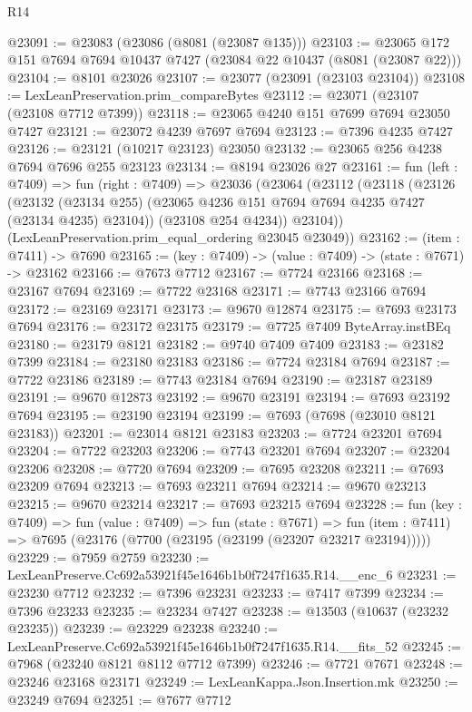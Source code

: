 \begin{lexlean}{R14}
\begin{coremodule}
@23091 := @23083 (@23086 (@8081 (@23087 @135)))
@23103 := @23065 @172 @151 @7694 @7694 @10437 @7427 (@23084 @22 @10437 (@8081 (@23087 @22)))
@23104 := @8101 @23026
@23107 := @23077 (@23091 (@23103 @23104))
@23108 := LexLeanPreservation.prim_compareBytes
@23112 := @23071 (@23107 (@23108 @7712 @7399))
@23118 := @23065 @4240 @151 @7699 @7694 @23050 @7427
@23121 := @23072 @4239 @7697 @7694
@23123 := @7396 @4235 @7427
@23126 := @23121 (@10217 @23123) @23050
@23132 := @23065 @256 @4238 @7694 @7696 @255 @23123
@23134 := @8194 @23026 @27
@23161 := fun (left : @7409) =>
  fun (right : @7409) =>
  @23036
    (@23064
      (@23112
        (@23118
          (@23126
            (@23132 (@23134 @255) (@23065 @4236 @151 @7694 @7694 @4235 @7427 (@23134 @4235) @23104))
            (@23108 @254 @4234))
          @23104))
      (LexLeanPreservation.prim_equal_ordering @23045 @23049))
@23162 := (item : @7411) -> @7690
@23165 := (key : @7409) -> (value : @7409) -> (state : @7671) -> @23162
@23166 := @7673 @7712
@23167 := @7724 @23166
@23168 := @23167 @7694
@23169 := @7722 @23168
@23171 := @7743 @23166 @7694
@23172 := @23169 @23171
@23173 := @9670 @12874
@23175 := @7693 @23173 @7694
@23176 := @23172 @23175
@23179 := @7725 @7409 ByteArray.instBEq
@23180 := @23179 @8121
@23182 := @9740 @7409 @7409
@23183 := @23182 @7399
@23184 := @23180 @23183
@23186 := @7724 @23184 @7694
@23187 := @7722 @23186
@23189 := @7743 @23184 @7694
@23190 := @23187 @23189
@23191 := @9670 @12873
@23192 := @9670 @23191
@23194 := @7693 @23192 @7694
@23195 := @23190 @23194
@23199 := @7693 (@7698 (@23010 @8121 @23183))
@23201 := @23014 @8121 @23183
@23203 := @7724 @23201 @7694
@23204 := @7722 @23203
@23206 := @7743 @23201 @7694
@23207 := @23204 @23206
@23208 := @7720 @7694
@23209 := @7695 @23208
@23211 := @7693 @23209 @7694
@23213 := @7693 @23211 @7694
@23214 := @9670 @23213
@23215 := @9670 @23214
@23217 := @7693 @23215 @7694
@23228 := fun (key : @7409) =>
  fun (value : @7409) =>
  fun (state : @7671) =>
  fun (item : @7411) => @7695 (@23176 (@7700 (@23195 (@23199 (@23207 @23217 @23194)))))
@23229 := @7959 @2759
@23230 := LexLeanPreserve.Cc692a53921f45e1646b1b0f7247f1635.R14.__enc_6
@23231 := @23230 @7712
@23232 := @7396 @23231
@23233 := @7417 @7399
@23234 := @7396 @23233
@23235 := @23234 @7427
@23238 := @13503 (@10637 (@23232 @23235))
@23239 := @23229 @23238
@23240 := LexLeanPreserve.Cc692a53921f45e1646b1b0f7247f1635.R14.__fits_52
@23245 := @7968 (@23240 @8121 @8112 @7712 @7399)
@23246 := @7721 @7671
@23248 := @23246 @23168 @23171
@23249 := LexLeanKappa.Json.Insertion.mk
@23250 := @23249 @7694
@23251 := @7677 @7712

\end{coremodule}
\end{lexlean}

